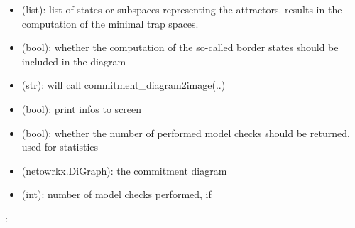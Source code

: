 \documentclass[letterpaper,10pt,english]{sphinxmanual}
\begin{document}
\begin{fulllineitems}
\begin{description}
\begin{itemize}
\item {} 
 (list): list of states or subspaces representing the attractors.  results in the computation of the minimal trap spaces.

\item {} 
 (bool): whether the computation of the so-called border states should be included in the diagram

\item {} 
 (str): will call commitment\_diagram2image(..)

\item {} 
 (bool): print infos to screen

\item {} 
 (bool): whether the number of performed model checks should be returned, used for statistics

\end{itemize}

\item[{\sphinxstylestrong{returns}::}] \leavevmode\begin{itemize}
\item {} 
 (netowrkx.DiGraph): the commitment diagram

\item {} 
 (int): number of model checks performed, if 

\end{itemize}

\end{description}

:

\begin{sphinxVerbatim}[commandchars=\\\{\}]
  
   
\PYG{p}{[}\PYG{p}{]}\PYG{p}{[}\PYG{p}{]}
\PYG{p}{[}\PYG{p}{]}\PYG{p}{[}\PYG{p}{]}
\end{sphinxVerbatim}

\end{fulllineitems}
\end{document}
